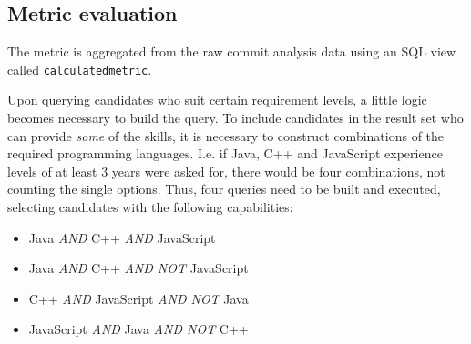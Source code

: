 \subsection{Metric evaluation}
The metric is aggregated from the raw commit analysis data using an SQL view called \verb=calculatedmetric=.



Upon querying candidates who suit certain requirement levels, a little logic becomes necessary to build the query. To include candidates in the result set who can provide \textit{some} of the skills, it is necessary to construct combinations of the required programming languages. I.e. if Java, C++ and JavaScript experience levels of at least 3 years were asked for, there would be four combinations, not counting the single options. Thus, four queries need to be built and executed, selecting candidates with the following capabilities:

\begin{itemize}
  \item Java \textit{AND} C++ \textit{AND} JavaScript
  \item Java \textit{AND} C++ \textit{AND NOT} JavaScript
  \item C++ \textit{AND} JavaScript \textit{AND NOT} Java
  \item JavaScript \textit{AND} Java \textit{AND NOT} C++
\end{itemize}


